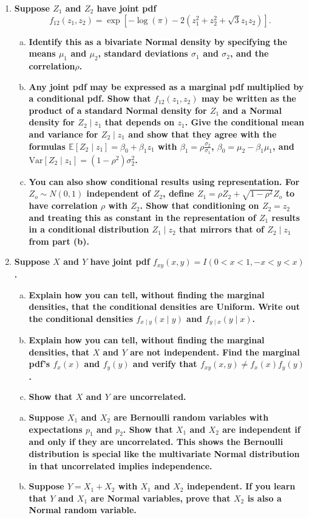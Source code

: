 \documentclass[11pt]{article}
\begin{document}
\begin{enumerate}
    \item \textbf{Suppose $Z_1$ and $Z_2$ have joint pdf}
    \[
      f_{12}(z_1, z_2) = \exp \left[ -\log (\pi ) - 2(z_1^2 + z_2^2 + \sqrt{3}z_1 z_2) \right].
    \]
    \begin{enumerate}[a)]
      \item \textbf{Identify this as a bivariate Normal density by specifying the means $\mu_1$ and $\mu_2$, standard deviations $\sigma_1$ and $\sigma_2$, and the correlation$ \rho $.}
      \item \textbf{Any joint pdf may be expressed as a marginal pdf multiplied by a conditional pdf. Show that $f_{12}(z_1, z_2)$ may be written as the product of a standard Normal density for $Z_1$ and a Normal density for $Z_2\mid z_1$ that depends on $z_1$.
      Give the conditional mean and variance for $Z_2 \mid z_1$ and show that they agree with the formulas $\mathbb{E}[Z_2 \mid z_1] = \beta_0 + \beta_1 z_1$ with $\beta_1 = \rho \frac{\sigma_2}{\sigma_1}$, 
      $\beta_0 = \mu_2 - \beta_1 \mu_1$, and $\mathrm{Var} \left[Z_2 \mid z_1 \right] = (1-\rho^2)\sigma_2^2$.}
      \item \textbf{You can also show conditional results using representation. For $Z_o \sim N(0, 1)$ independent of $Z_2$, define $Z_1 = \rho Z_2 + \sqrt{1-\rho^2}Z_o$ to have correlation $\rho$ with $Z_2$.
      Show that conditioning on $Z_2 = z_2$ and treating this as constant in the representation of $Z_1$ results in a conditional distribution $Z_1 \mid z_2$ that mirrors that of $Z_2 \mid z_1$ from part (b).}
    \end{enumerate}
    \item \textbf{Suppose $X$ and $Y$ have joint pdf $f_{xy}(x, y) = I(0 < x < 1, -x < y < x)$.}
    \begin{enumerate}[a)]
      \item \textbf{Explain how you can tell, without finding the marginal densities, that the conditional densities are Uniform.
      Write out the conditional densities $f_{x \mid y}(x \mid y)$ and $f_{y \mid x}(y \mid x)$.}
      \item \textbf{Explain how you can tell, without finding the marginal densities, that $X$ and $Y$ are not independent. Find the marginal pdf's $f_x(x)$ and $f_y(y)$ 
      and verify that $f_{xy}(x, y) \neq f_x(x)f_y(y)$.}
      \item \textbf{Show that $X$ and $Y$ are uncorrelated.}
    \end{enumerate}

    \begin{enumerate}[a)]
      \item \textbf{Suppose $X_1$ and $X_2$ are Bernoulli random variables with expectations $p_1$ and $p_2$. Show that $X_1$ and $X_2$ are independent if and only if they are uncorrelated.
      This shows the Bernoulli distribution is special like the multivariate Normal distribution in that uncorrelated implies independence.}
      \item \textbf{Suppose $Y = X_1 + X_2$ with $X_1$ and $X_2$ independent. If you learn that $Y$ and $X_1$ are
      Normal variables, prove that $X_2$ is also a Normal random variable.}
    \end{enumerate}
    
\end{enumerate}
\end{document}
